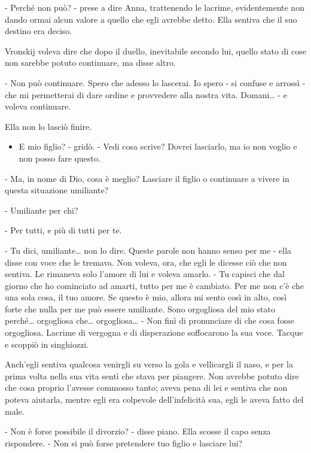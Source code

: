 - Perché non può? - prese a dire Anna, trattenendo le lacrime, evidentemente non dando ormai alcun valore a quello che egli avrebbe detto. Ella sentiva che il suo destino era deciso. 

Vronskij voleva dire che dopo il duello, inevitabile secondo lui, quello stato di cose non sarebbe potuto continuare, ma disse altro. 

- Non può continuare. Spero che adesso lo lascerai. Io spero - si confuse e arrossì - che mi permetterai di dare ordine e provvedere alla nostra vita. Domani\ldots{} - e voleva continuare. 

Ella non lo lasciò finire. 

\begin{itemize} \itemsep1pt\parskip0pt \item E mio figlio? - gridò. - Vedi cosa scrive? Dovrei lasciarlo, ma io non voglio e non posso fare questo. \end{itemize} 

- Ma, in nome di Dio, cosa è meglio? Lasciare il figlio o continuare a vivere in questa situazione umiliante? 

- Umiliante per chi? 

- Per tutti, e più di tutti per te. 

- Tu dici, umiliante\ldots{} non lo dire. Queste parole non hanno senso per me - ella disse con voce che le tremava. Non voleva, ora, che egli le dicesse ciò che non sentiva. Le rimaneva solo l'amore di lui e voleva amarlo. - Tu capisci che dal giorno che ho cominciato ad amarti, tutto per me è cambiato. Per me non c'è che una sola cosa, il tuo amore. Se questo è mio, allora mi sento così in alto, così forte che nulla per me può essere umiliante. Sono orgogliosa del mio stato perché\ldots{} orgogliosa che\ldots{} orgogliosa\ldots{} - Non finì di pronunciare di che cosa fosse orgogliosa. Lacrime di vergogna e di disperazione soffocarono la sua voce. Tacque e scoppiò in singhiozzi. 

Anch'egli sentiva qualcosa venirgli su verso la gola e vellicargli il naso, e per la prima volta nella sua vita sentì che stava per piangere. Non avrebbe potuto dire che cosa proprio l'avesse commosso tanto; aveva pena di lei e sentiva che non poteva aiutarla, mentre egli era colpevole dell'infelicità sua, egli le aveva fatto del male. 

- Non è forse possibile il divorzio? - disse piano. Ella scosse il capo senza rispondere. - Non si può forse pretendere tuo figlio e lasciare lui? 

